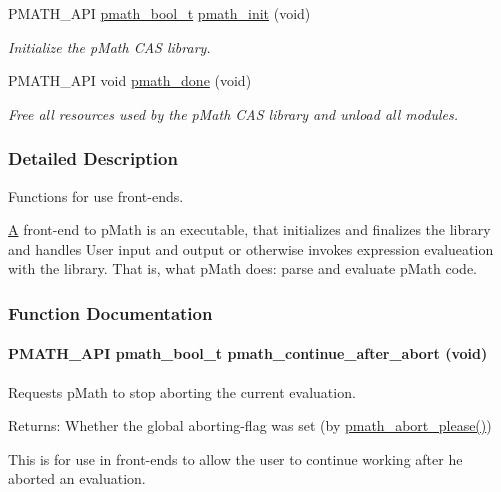 \begin{CompactItemize}
PMATH\_\-API \hyperlink{group__general__types_gc92090cb0b56345d6c379ed2341d4ef4}{pmath\_\-bool\_\-t} \hyperlink{group__frontend_gfb9f2c789bee5295c6794d16c0164943}{pmath\_\-init} (void)
\begin{CompactList}\small\item\em Initialize the pMath CAS library. \item\end{CompactList}\item 
PMATH\_\-API void \hyperlink{group__frontend_g012705e1fd248a7cebf738bae6375dd9}{pmath\_\-done} (void)
\begin{CompactList}\small\item\em Free all resources used by the pMath CAS library and unload all modules. \item\end{CompactList}\end{CompactItemize}


\subsubsection{Detailed Description}
Functions for use front-ends. 

\hyperlink{class_a}{A} front-end to pMath is an executable, that initializes and finalizes the library and handles User input and output or otherwise invokes expression evalueation with the library. That is, what pMath does: parse and evaluate pMath code. 

\subsubsection{Function Documentation}
\hypertarget{group__frontend_g4934c2dc54f852627f8b291543a21e43}{
\paragraph[{pmath\_\-continue\_\-after\_\-abort}]{\setlength{\rightskip}{0pt plus 5cm}PMATH\_\-API {\bf pmath\_\-bool\_\-t} pmath\_\-continue\_\-after\_\-abort (void)}\hfill}
\label{group__frontend_g4934c2dc54f852627f8b291543a21e43}


Requests pMath to stop aborting the current evaluation. 

\begin{Desc}
\item[Returns:]Whether the global aborting-flag was set (by \hyperlink{group__threads_g84e45036b76764def6390af12d2070bf}{pmath\_\-abort\_\-please()})\end{Desc}
This is for use in front-ends to allow the user to continue working after he aborted an evaluation.

